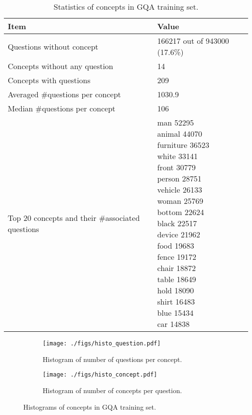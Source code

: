 \documentclass{article} \usepackage{iclr2022_conference,times}
\begin{document}
\begin{table}[h]
    \centering
    \begin{tabular}{l|l}
    \toprule
    Item & Value \\
    \midrule  
    Questions without concept & 166217 out of 943000 (17.6\%)\\
    Concepts without any question & 14 \\
    Concepts with  questions & 209\\
    Averaged \#questions per concept & 1030.9\\
    Median \#questions per concept & 106\\
    \midrule
    Top 20 concepts and their \#associated questions & \makecell[tl]{
\small{man 52295}\\
\small{animal 44070}\\
\small{furniture 36523}\\
\small{white 33141}\\
\small{front 30779}\\
\small{person 28751}\\
\small{vehicle 26133}\\
\small{woman 25769}\\
\small{bottom 22624}\\
\small{black 22517}\\
\small{device 21962}\\
\small{food 19683}\\
\small{fence 19172}\\
\small{chair 18872}\\
\small{table 18649}\\
\small{hold 18090}\\
\small{shirt 16483}\\
\small{blue 15434}\\
\small{car 14838}\\
} \\
    \bottomrule
    \end{tabular}
    \caption{Statistics of concepts in GQA training set.}
    \label{tab:gqa_concepts}
\end{table}

\begin{figure}[h]
    \centering
     \begin{subfigure}[b]{0.48\textwidth}
         \centering
    \texttt{[image: ./figs/histo\_question.pdf]}
    \caption{Histogram of number of questions per concept.}
    \label{fig:histo_question}
     \end{subfigure}
     \hfill
    \begin{subfigure}[b]{0.48\textwidth}
         \centering
         \texttt{[image: ./figs/histo\_concept.pdf]}
         \caption{Histogram of number of concepts per question.}
    \label{fig:histo_concept}
     \end{subfigure}
     \caption{Histograms of concepts in GQA training set.}
\end{figure}
\end{document}
